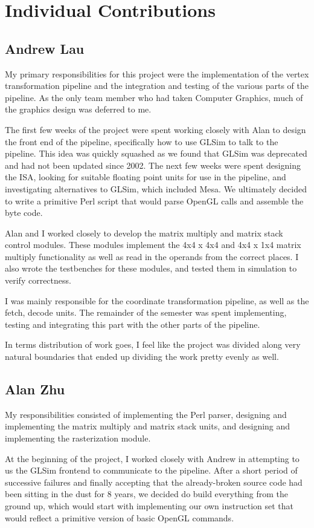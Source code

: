 \documentclass[letterpaper,10pt]{article}
\begin{document}
\section{Individual Contributions}
\subsection{Andrew Lau}
My primary responsibilities for this project were the implementation of the vertex transformation pipeline and the integration and testing of the various parts of the pipeline. As the only team member who had taken Computer Graphics, much of the graphics design was deferred to me. 

The first few weeks of the project were spent working closely with Alan to design the front end of the pipeline, specifically how to use GLSim to talk to the pipeline. This idea was quickly squashed as we found that GLSim was deprecated and had not been updated since 2002. The next few weeks were spent designing the ISA, looking for suitable floating point units for use in the pipeline, and investigating alternatives to GLSim, which included Mesa. We ultimately decided to write a primitive Perl script that would parse OpenGL calls and assemble the byte code.

Alan and I worked closely to develop the matrix multiply and matrix stack control modules. These modules implement the 4x4 x 4x4 and 4x4 x 1x4 matrix multiply functionality as well as read in the operands from the correct places. I also wrote the testbenches for these modules, and tested them in simulation to verify correctness.

I was mainly responsible for the coordinate transformation pipeline, as well as the fetch, decode units. The remainder of the semester was spent implementing, testing and integrating this part with the other parts of the pipeline.

In terms distribution of work goes, I feel like the project was divided along very natural boundaries that ended up dividing the work pretty evenly as well. 

\subsection{Alan Zhu}
My responsibilities consisted of implementing the Perl parser, designing and implementing the matrix multiply and matrix stack units, and designing and implementing the rasterization module.

At the beginning of the project, I worked closely with Andrew in attempting to us the GLSim frontend to communicate to the pipeline. After a short period of successive failures and finally accepting that the already-broken source code had been sitting in the dust for 8 years, we decided do build everything from the ground up, which would start with implementing our own instruction set that would reflect a primitive version of basic OpenGL commands. 
\end{document}
